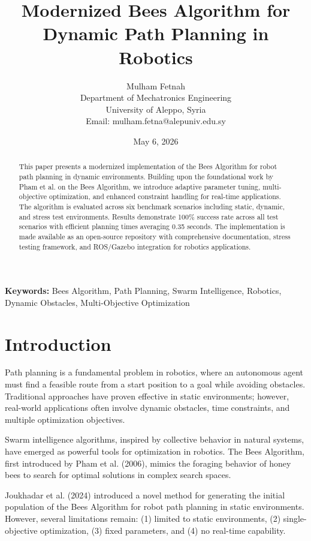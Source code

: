 \documentclass[12pt]{article}
\title{Modernized Bees Algorithm for Dynamic Path Planning in Robotics}
\author{
Mulham Fetnah\\
Department of Mechatronics Engineering\\
University of Aleppo, Syria\\
Email: mulham.fetna@alepuniv.edu.sy
}
\date{May 6, 2026}
\begin{document}
\maketitle

\begin{abstract}
This paper presents a modernized implementation of the Bees Algorithm for robot path planning in dynamic environments. Building upon the foundational work by Pham et al. on the Bees Algorithm, we introduce adaptive parameter tuning, multi-objective optimization, and enhanced constraint handling for real-time applications. The algorithm is evaluated across six benchmark scenarios including static, dynamic, and stress test environments. Results demonstrate 100\% success rate across all test scenarios with efficient planning times averaging 0.35 seconds. The implementation is made available as an open-source repository with comprehensive documentation, stress testing framework, and ROS/Gazebo integration for robotics applications.
\end{abstract}

\bigskip

\noindent\textbf{Keywords:} Bees Algorithm, Path Planning, Swarm Intelligence, Robotics, Dynamic Obstacles, Multi-Objective Optimization

\bigskip

\section{Introduction}

Path planning is a fundamental problem in robotics, where an autonomous agent must find a feasible route from a start position to a goal while avoiding obstacles. Traditional approaches have proven effective in static environments; however, real-world applications often involve dynamic obstacles, time constraints, and multiple optimization objectives.

Swarm intelligence algorithms, inspired by collective behavior in natural systems, have emerged as powerful tools for optimization in robotics. The Bees Algorithm, first introduced by Pham et al. (2006), mimics the foraging behavior of honey bees to search for optimal solutions in complex search spaces.

Joukhadar et al. (2024) introduced a novel method for generating the initial population of the Bees Algorithm for robot path planning in static environments. However, several limitations remain: (1) limited to static environments, (2) single-objective optimization, (3) fixed parameters, and (4) no real-time capability.
\end{document}
